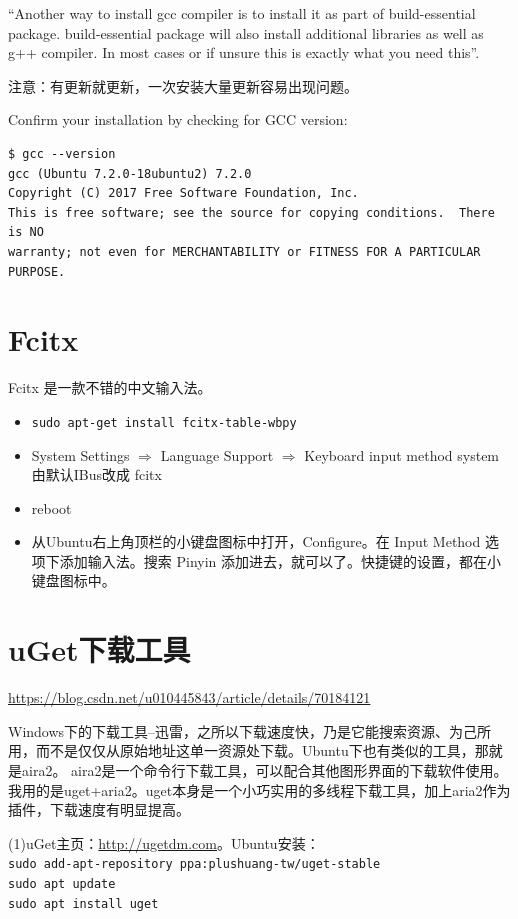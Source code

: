 “Another way to install gcc compiler is to install it as part of build-essential package. build-essential package will also install additional libraries as well as g++ compiler. In most cases or if unsure this is exactly what you need this”.

注意：有更新就更新，一次安装大量更新容易出现问题。

Confirm your installation by checking for GCC version:

\begin{verbatim}
$ gcc --version
gcc (Ubuntu 7.2.0-18ubuntu2) 7.2.0
Copyright (C) 2017 Free Software Foundation, Inc.
This is free software; see the source for copying conditions.  There is NO
warranty; not even for MERCHANTABILITY or FITNESS FOR A PARTICULAR PURPOSE.
\end{verbatim}




\section{Fcitx}
Fcitx 是一款不错的中文输入法。
\begin{itemize}
\item \verb|sudo apt-get install fcitx-table-wbpy|

\item System Settings $\Longrightarrow$ Language Support $\Longrightarrow$
Keyboard input method system 由默认IBus改成 fcitx

\item reboot

\item 从Ubuntu右上角顶栏的小键盘图标中打开，Configure。在 Input Method 选项下添加输入法。搜索 Pinyin 添加进去，就可以了。快捷键的设置，都在小键盘图标中。
\end{itemize}



\section{uGet下载工具}
\url{https://blog.csdn.net/u010445843/article/details/70184121}

Windows下的下载工具--迅雷，之所以下载速度快，乃是它能搜索资源、为己所用，而不是仅仅从原始地址这单一资源处下载。Ubuntu下也有类似的工具，那就是aira2。
aira2是一个命令行下载工具，可以配合其他图形界面的下载软件使用。我用的是uget+aria2。uget本身是一个小巧实用的多线程下载工具，加上aria2作为插件，下载速度有明显提高。

(1)uGet主页：\url{http://ugetdm.com}。Ubuntu安装：\\
\verb|sudo add-apt-repository ppa:plushuang-tw/uget-stable|\\
\verb|sudo apt update|\\
\verb|sudo apt install uget|

